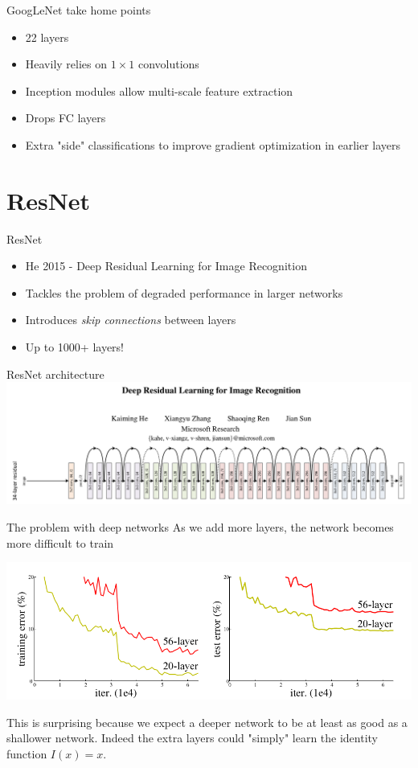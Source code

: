 \documentclass[9pt, aspectratio=169]{beamer}
\begin{document}
\begin{frame}
    {GoogLeNet take home points}
    \begin{itemize}
        \item 22 layers
        \item Heavily relies on $1\times 1$ convolutions
        \item Inception modules allow multi-scale feature extraction
        \item Drops FC layers
        \item Extra "side" classifications to improve gradient optimization in earlier layers
    \end{itemize}
\end{frame}

\section{ResNet}

\begin{frame}
    {ResNet}
    \begin{itemize}
        \item He 2015 - Deep Residual Learning for Image Recognition
        \item Tackles the problem of degraded performance in larger networks
        \item Introduces \textit{skip connections} between layers
        \item Up to 1000+ layers!
    \end{itemize}
\end{frame}

\begin{frame}
    {ResNet architecture}
    \centering
    \includegraphics[width=\textwidth]{resnet.png}
\end{frame}

\begin{frame}
    {The problem with deep networks}
    As we add more layers, the network becomes more difficult to train

    \centering
    \includegraphics[width=.7\textwidth]{resnet_big_small_network.png}

    This is surprising because we expect a deeper network to be at least as good as a shallower network. Indeed the extra layers could "simply" learn the identity function $I(x) = x$.
\end{frame}
\end{document}
